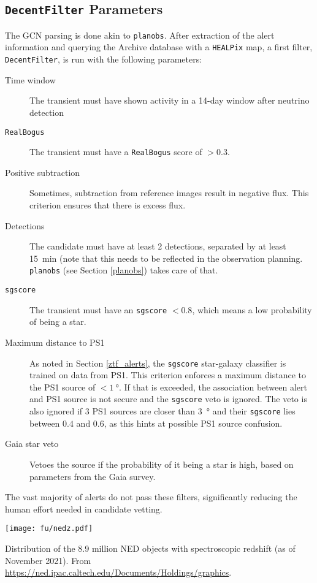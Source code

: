 \subsection{\texttt{DecentFilter} Parameters}
The GCN parsing is done akin to \texttt{planobs}. After extraction of the alert information and querying the Archive database with a \texttt{HEALPix} map, a first filter, \texttt{DecentFilter}, is run with the following parameters:
\begin{description}
    \item[Time window] The transient must have shown activity in a 14-day window after neutrino detection
    \item[\texttt{RealBogus}] The transient must have a \texttt{RealBogus} score of $>0.3$.
    \item[Positive subtraction] Sometimes, subtraction from reference images result in negative flux. This criterion ensures that there is excess flux.
    \item[Detections] The candidate must have at least 2 detections, separated by at least \SI{15}{\minute} (note that this needs to be reflected in the observation planning. \texttt{planobs} (see Section \ref{planobs}) takes care of that.
    \item[\texttt{sgscore}] The transient must have an \texttt{sgscore} $<0.8$, which means a low probability of being a star.
    \item[Maximum distance to PS1] As noted in Section \ref{ztf_alerts}, the \texttt{sgscore} star-galaxy classifier is trained on data from PS1. This criterion enforces a maximum distance to the PS1 source of $<\SI{1}{\degree}$. If that is exceeded, the association between alert and PS1 source is not secure and the \texttt{sgscore} veto is ignored. The veto is also ignored if 3 PS1 sources are closer than \SI{3}{\degree} and their \texttt{sgscore} lies between $0.4$ and $0.6$, as this hints at possible PS1 source confusion.
    \item[Gaia star veto] Vetoes the source if the probability of it being a star is high, based on parameters from the Gaia survey.
\end{description}
The vast majority of alerts do not pass these filters, significantly reducing the human effort needed in candidate vetting.
\begin{marginfigure}
    \texttt{[image: fu/nedz.pdf]}
    \caption[NED spectroscopic redshift distribution]{Distribution of the 8.9 million NED objects with spectroscopic redshift (as of November 2021). From \url{https://ned.ipac.caltech.edu/Documents/Holdings/graphics}.}
\end{marginfigure} 
